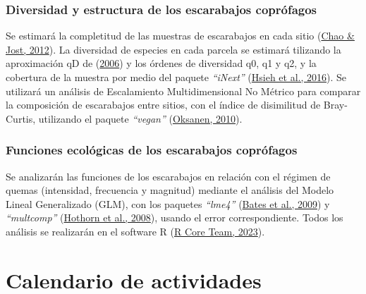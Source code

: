 \documentclass[
  11pt,
  a4paper]{book}
\begin{document}
\hypertarget{diversidad-y-estructura-de-los-escarabajos-copruxf3fagos}{%
\subsection{Diversidad y estructura de los escarabajos coprófagos}\label{diversidad-y-estructura-de-los-escarabajos-copruxf3fagos}}

Se estimará la completitud de las muestras de escarabajos en cada sitio (\protect\hyperlink{ref-chao2012coverage}{Chao \& Jost, 2012}). La diversidad de especies en cada parcela se estimará tilizando la aproximación qD de (\protect\hyperlink{ref-jost2006entropy}{2006}) y los órdenes de diversidad q0, q1 y q2, y la cobertura de la muestra por medio del paquete \emph{``iNext''} (\protect\hyperlink{ref-hsieh2016inext}{Hsieh et al., 2016}). Se utilizará un análisis de Escalamiento Multidimensional No Métrico para comparar la composición de escarabajos entre sitios, con el índice de disimilitud de Bray-Curtis, utilizando el paquete \emph{``vegan''} (\protect\hyperlink{ref-oksanen2010vegan}{Oksanen, 2010}).

\hypertarget{funciones-ecoluxf3gicas-de-los-escarabajos-copruxf3fagos-1}{%
\subsection{Funciones ecológicas de los escarabajos coprófagos}\label{funciones-ecoluxf3gicas-de-los-escarabajos-copruxf3fagos-1}}

Se analizarán las funciones de los escarabajos en relación con el régimen de quemas (intensidad, frecuencia y magnitud) mediante el análisis del Modelo Lineal Generalizado (GLM), con los paquetes \emph{``lme4''} (\protect\hyperlink{ref-bates2009package}{Bates et al., 2009}) y \emph{``multcomp''} (\protect\hyperlink{ref-hothorn2008simultaneous}{Hothorn et al., 2008}), usando el error correspondiente. Todos los análisis se realizarán en el software R (\protect\hyperlink{ref-R2023}{R Core Team, 2023}).

\hypertarget{calendario-de-actividades}{%
\chapter{Calendario de actividades}\label{calendario-de-actividades}}
\end{document}
